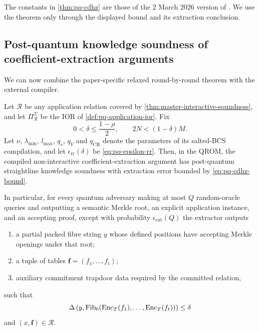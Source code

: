 The constants in \cref{thm:pq-cdhz} are those of the 2 March 2026 version of \cite{CDHZ25}.  We use the theorem only through the displayed bound and its extraction conclusion.

\subsection{Post-quantum knowledge soundness of coefficient-extraction arguments}
\label{sec:pq-main-theorem}

We can now combine the paper-specific relaxed round-by-round theorem with the external compiler.

\begin{theorem}
\label{thm:pq-main}
Let $\mathcal R$ be any application relation covered by \cref{thm:master-interactive-soundness}, and let $\Pi_{\mathcal R}^{\Sigma}$ be the IOR of \cref{def:pq-application-ior}.  Fix
\[
  0<\delta\le\frac{1-\rho}{2},
  \qquad
  2N<(1-\delta)M.
\]
Let $\nu$, $\lambda_{\min}$, $l_{\max}$, $q_s$, $q_V$ and $q_{\mathrm{CR}}$ denote the parameters of its salted-BCS compilation, and let $\epsilon_{\mathrm{rr}}(\delta)$ be \eqref{eq:pq-epsilon-rr}.  Then, in the QROM, the compiled non-interactive coefficient-extraction argument has post-quantum straightline knowledge soundness with extraction error bounded by \eqref{eq:pq-cdhz-bound}.

In particular, for every quantum adversary making at most $Q$ random-oracle queries and outputting a semantic Merkle root, an explicit application instance, and an accepting proof, except with probability $\epsilon_{\mathrm{ext}}(Q)$ the extractor outputs
\begin{enumerate}[label=(\arabic*),leftmargin=*]
  \item a partial packed fibre string $y$ whose defined positions have accepting Merkle openings under that root;
  \item a tuple of tables $\mathbf f=(f_1,\ldots,f_t)$;
  \item auxiliary commitment trapdoor data required by the committed relation,
\end{enumerate}
such that
\begin{equation}
  \Delta\left(
      y,
      \operatorname{Fib}_0(\operatorname{Enc}_T(f_1),\ldots,\operatorname{Enc}_T(f_t))
  \right)
  \le\delta
  \label{eq:pq-extracted-distance}
\end{equation}
and $(x,\mathbf f)\in\mathcal R$.
\end{theorem}

